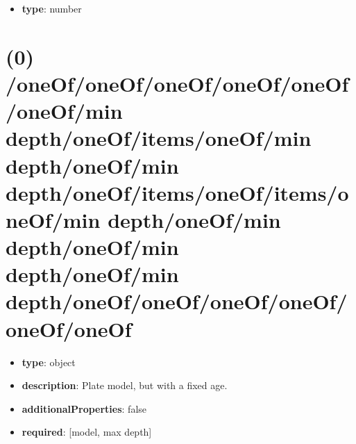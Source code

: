 \begin{itemize}[leftmargin=3em]\item {\bf type}: number
\end{itemize}\section{(0) /oneOf/oneOf/oneOf/oneOf/oneOf/oneOf/min depth/oneOf/items/oneOf/min depth/oneOf/min depth/oneOf/items/oneOf/items/oneOf/min depth/oneOf/min depth/oneOf/min depth/oneOf/min depth/oneOf/oneOf/oneOf/oneOf/oneOf/oneOf}
\begin{itemize}[leftmargin=0em]\item {\bf type}: object
\item {\bf description}: Plate model, but with a fixed age.
\item {\bf additionalProperties}: false
\item {\bf required}: [model, max depth]\end{itemize}
